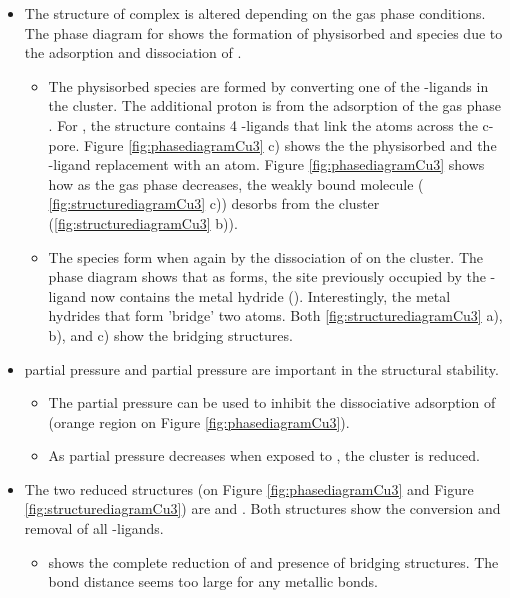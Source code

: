 \documentclass[journal=jctcce,manuscript=article]{achemso}
\begin{document}
\begin{itemize}
    \item The structure of  complex is altered depending on the gas phase conditions. The phase diagram for  shows the formation of physisorbed  and  species due to the adsorption and dissociation of . 
    \begin{itemize}
        \item The physisorbed  species are formed by converting one of the -ligands in the cluster. The additional proton is from the adsorption of the gas phase . For , the structure contains 4 -ligands that link the  atoms across the c-pore. Figure \ref{fig:phasediagramCu3} c) shows the the physisorbed  and the -ligand replacement with an  atom. Figure \ref{fig:phasediagramCu3} shows how as the gas phase  decreases, the weakly bound  molecule ( \ref{fig:structurediagramCu3} c)) desorbs from the cluster (\ref{fig:structurediagramCu3} b)).
        \item The  species form when again by the dissociation of  on the cluster. The phase diagram shows that as  forms, the site previously occupied by the -ligand now contains the metal hydride (). Interestingly, the metal hydrides that form 'bridge' two  atoms. Both \ref{fig:structurediagramCu3} a), b), and c) show the bridging  structures.
    \end{itemize}
    \item {} partial pressure and  partial pressure are important in the structural stability. 
    \begin{itemize}
        \item The  partial pressure can be used to inhibit the dissociative adsorption of  (orange region on Figure \ref{fig:phasediagramCu3}).
        \item As  partial pressure decreases when exposed to , the cluster is reduced.
    \end{itemize}
    \item The two reduced structures (on Figure \ref{fig:phasediagramCu3} and Figure \ref{fig:structurediagramCu3}) are  and . Both structures show the conversion and removal of all -ligands.
    \begin{itemize}
        \item {} shows the complete reduction of  and presence of  bridging structures. The bond distance seems too large for any  metallic bonds.  

\end{itemize}
\end{itemize}
\end{document}
